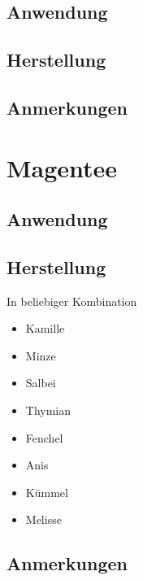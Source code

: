   

\subsection{Anwendung}

\subsection{Herstellung}

\subsection{Anmerkungen}






\section{Magentee}

  

\subsection{Anwendung}

\subsection{Herstellung}

In beliebiger Kombination

\begin{itemize}
	\item Kamille
	\item Minze
	\item Salbei
	\item Thymian
	\item Fenchel
	\item Anis
	\item Kümmel
	\item Melisse
\end{itemize}

\subsection{Anmerkungen}





